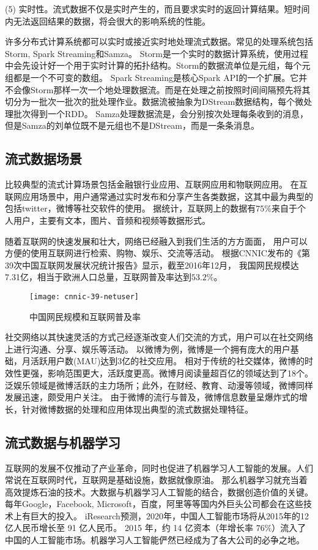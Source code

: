 (5) 实时性。流式数据不仅是实时产生的，而且要求实时的返回计算结果。短时间内无法返回结果的数据，将会很大的影响系统的性能。

许多分布式计算系统都可以实时或接近实时地处理流式数据。常见的处理系统包括Storm, Spark Streaming和Samza。
Storm是一个实时的数据计算系统，使用过程中会先设计好一个用于实时计算的拓扑结构。Storm的数据流单位是元组，每个元组都是一个不可变的数组。
Spark Streaming是核心Spark API的一个扩展。它并不会像Storm那样一次一个地处理数据流。而是在处理之前按照时间间隔预先将其切分为一批次一批次的批处理作业。数据流被抽象为DStream数据结构，每个微处理批次得到一个RDD。
Samza处理数据流是，会分别按次处理每条收到的消息，但是Samza的刘单位既不是元组也不是DStream，而是一条条消息。

\subsection{流式数据场景}
比较典型的流式计算场景包括金融银行业应用、互联网应用和物联网应用\cite{sun2013bdsc}。
在互联网应用场景中，用户通常通过实时发布和分享产生各类数据，这其中最为典型的包括twitter，微博等社交软件的使用。
据统计，互联网上的数据有$75\%$来自于个人用户，主要有文本，图片、音频和视频等数据形式。


随着互联网的快速发展和壮大，网络已经融入到我们生活的方方面面，
用户可以方便的使用互联网进行检索、购物、娱乐、交流等活动。
根据CNNIC发布的《第39次中国互联网发展状况统计报告》显示，截至2016年12月，
我国网民规模达7.31亿，相当于欧洲人口总量，互联网普及率达到$53.2\%$\cite{website:cnnic-39}。

\begin{figure}[htb]\centering
  \texttt{[image: cnnic-39-netuser]}
\caption{中国网民规模和互联网普及率}
\label{fig:cnnic-39-netuser}       %
\end{figure}

社交网络以其快速灵活的方式己经逐渐改变人们交流的方式，用户可以在社交网络上进行沟通、分享、娱乐等活动。
以微博为例，微博是一个拥有庞大的用户基础，月活跃用户数(MAU)达到3亿的社交应用。
相对于传统的社交媒体，微博的时效性更强，影响范围更大，活跃度更高。微博月阅读量超百亿的领域达到了18个。
泛娱乐领域是微博活跃的主力场所；此外，在财经、教育、动漫等领域，微博同样发展迅速，颇受用户关注。
由于微博的流行与普及，微博信息数量呈爆炸式的增长，针对微博数据的处理和应用体现出典型的流式数据处理特征。

\subsection{流式数据与机器学习}
互联网的发展不仅推动了产业革命，同时也促进了机器学习人工智能的发展。人们常说在互联网时代，互联网是基础设施，数据就像原油。
那么机器学习就充当着高效提炼石油的技术。大数据与机器学习人工智能的结合，数据创造价值的关键。
每年Google，Facebook, Microsoft，百度，阿里等等国内外巨头公司都会在这些技术上有巨大的投入。
iResearch预测，2020年，中国人工智能市场将从2015年的12 亿人民币增长至 91 亿人民币。
2015 年，约 14 亿资本（年增长率 $76\%$）流入了中国的人工智能市场。机器学习人工智能俨然已经成为了各大公司的必争之地。

